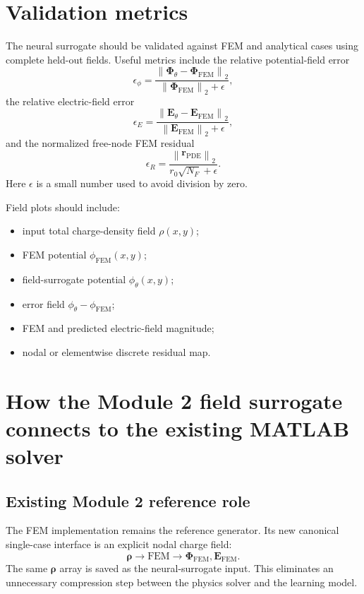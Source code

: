 \documentclass[11pt]{article}
\newcommand{\Evec}{\mathbf{E}}
\begin{document}
\section{Validation metrics}

The neural surrogate should be validated against FEM and analytical cases using complete held-out fields. Useful metrics include the relative potential-field error
\begin{equation}
\epsilon_{\phi}=\frac{\left\|\bm{\Phi}_{\theta}-\bm{\Phi}_{\mathrm{FEM}}\right\|_2}{\left\|\bm{\Phi}_{\mathrm{FEM}}\right\|_2+\epsilon},
\end{equation}
the relative electric-field error
\begin{equation}
\epsilon_{E}=\frac{\left\|\Evec_{\theta}-\Evec_{\mathrm{FEM}}\right\|_2}{\left\|\Evec_{\mathrm{FEM}}\right\|_2+\epsilon},
\end{equation}
and the normalized free-node FEM residual
\begin{equation}
\epsilon_R=\frac{\left\|\bm{r}_{\mathrm{PDE}}\right\|_2}{r_0\sqrt{N_F}+\epsilon}.
\end{equation}
Here $\epsilon$ is a small number used to avoid division by zero.

Field plots should include:
\begin{itemize}[leftmargin=2em]
    \item input total charge-density field $\rho(x,y)$;
    \item FEM potential $\phi_{\mathrm{FEM}}(x,y)$;
    \item field-surrogate potential $\phi_{\theta}(x,y)$;
    \item error field $\phi_{\theta}-\phi_{\mathrm{FEM}}$;
    \item FEM and predicted electric-field magnitude;
    \item nodal or elementwise discrete residual map.
\end{itemize}

\section{How the Module 2 field surrogate connects to the existing MATLAB solver}

\subsection{Existing Module 2 reference role}

The FEM implementation remains the reference generator. Its new canonical single-case interface is an explicit nodal charge field:
\begin{equation}
\bm{\rho}
\longrightarrow
\text{FEM}
\longrightarrow
\bm{\Phi}_{\mathrm{FEM}},\Evec_{\mathrm{FEM}}.
\end{equation}
The same $\bm{\rho}$ array is saved as the neural-surrogate input. This eliminates an unnecessary compression step between the physics solver and the learning model.
\end{document}
